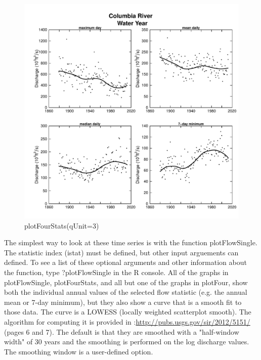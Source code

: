 \documentclass[a4paper,11pt]{article}\usepackage{graphicx, color}
\newenvironment{knitrout}{}{} %
\begin{document}
\begin{knitrout}
\color{fgcolor}\begin{figure}[]

\includegraphics[width=1\linewidth,height=1\linewidth]{figure/plotFourStats} \caption[plotFourStats(qUnit=3)]{plotFourStats(qUnit=3)\label{fig:plotFourStats}}
\end{figure}


\end{knitrout}



\FloatBarrier

The simplest way to look at these time series is with the function plotFlowSingle. The statistic index (istat) must be defined, but other input arguements can defined. To see a list of these optional arguments and other information about the function, type ?plotFlowSingle in the R console. All of the graphs in plotFlowSingle, plotFourStats, and all but one of the graphs in plotFour, show both the individual annual values of the selected flow statistic (e.g. the annual mean or 7-day minimum), but they also show a curve that is a smooth fit to those data.  The curve is a LOWESS (locally weighted scatterplot smooth).  The algorithm for computing it is provided in \cite{HirschV}:\url{http://pubs.usgs.gov/sir/2012/5151/}  (pages 6 and 7).  The default is that they are smoothed with a "half-window width" of 30 years and the smoothing is performed on the log discharge values.  The smoothing window is a user-defined option. 
\end{document}
